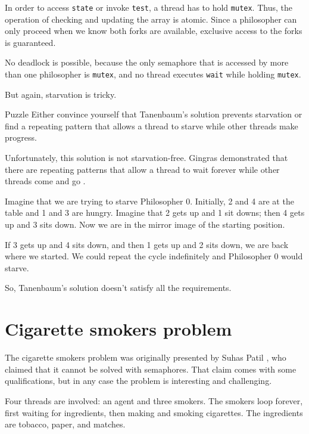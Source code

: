 In order to access {\tt state} or invoke {\tt test}, a thread
has to hold {\tt mutex}.  Thus, the operation of checking and
updating the array is atomic.  Since a philosopher can only proceed
when we know both forks are available, exclusive access to the forks
is guaranteed.

No deadlock is possible, because the only semaphore that is accessed
by more than one philosopher is {\tt mutex}, and no thread executes
{\tt wait} while holding {\tt mutex}.

But again, starvation is tricky.

\begin{puzzlebox}{Puzzle}
Either convince yourself that Tanenbaum's solution prevents
starvation or find a repeating pattern that allows a thread to starve
while other threads make progress.
\end{puzzlebox}



Unfortunately, this solution is not starvation-free.  Gingras
demonstrated that there are repeating patterns that allow a
thread to wait forever while other threads come and go
\cite{gingras90dining}.

Imagine that we are trying to starve Philosopher 0.  Initially,
2 and 4 are at the table and 1 and 3 are hungry.  Imagine that 2 gets up and
1 sit downs; then 4 gets up and 3 sits down.
Now we are in the mirror image of the starting position.

If 3 gets up and 4 sits
down, and then 1 gets up and 2 sits down, we are back
where we started.  We could repeat the cycle indefinitely and
Philosopher 0 would starve.

So, Tanenbaum's solution doesn't satisfy all the requirements.


\newpage
\section {Cigarette smokers problem}

The cigarette smokers problem was originally presented by
Suhas Patil \cite{patil}, who claimed that it cannot be solved with
semaphores.  That claim comes with some qualifications, but in
any case the problem is interesting and challenging.

Four threads are involved: an agent and three smokers.  The smokers
loop forever, first waiting for ingredients, then making and smoking
cigarettes.  The ingredients are tobacco, paper, and matches.

